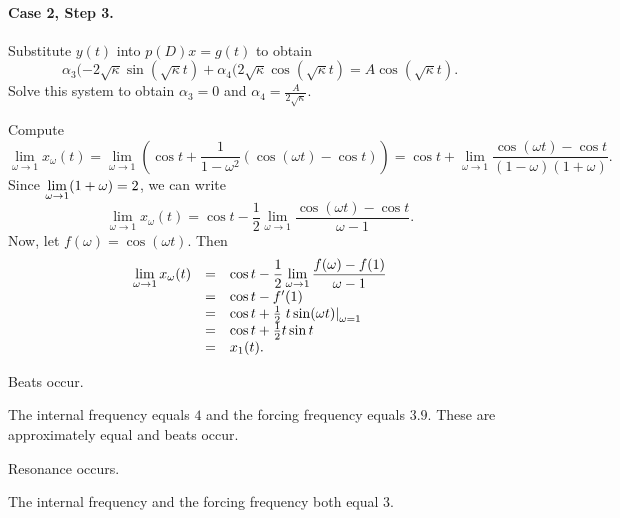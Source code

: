 \paragraph{Case 2, Step 3.} Substitute $y(t)$ into $p(D)x = g(t)$ to obtain
\[
\alpha_3(-2\sqrt{\kappa}\sin(\sqrt{\kappa}t) +
\alpha_4(2\sqrt{\kappa}\cos(\sqrt{\kappa}t)
= A\cos(\sqrt{\kappa}t).
\]
Solve this system to obtain $\alpha_3 = 0$ and
$\alpha_4 = \frac{A}{2\sqrt{\kappa}}$.

Compute
\[
\lim_{\omega \rightarrow 1} x_\omega(t) =
\lim_{\omega \rightarrow 1}\left(\cos t + \frac{1}{1 - \omega^2}
(\cos(\omega t) - \cos t)\right) =
\cos t + \lim_{\omega \rightarrow 1}\frac{\cos(\omega t) - \cos t}
{(1 - \omega)(1 + \omega)}.
\]
Since $\displaystyle \lim_{\omega \rightarrow 1}(1 + \omega) = 2$, we can write
\[
\lim_{\omega \rightarrow 1} x_\omega(t) =
\cos t - \frac{1}{2}\lim_{\omega \rightarrow 1}
\frac{\cos(\omega t) - \cos t}{\omega - 1}.
\]
Now, let $f(\omega) = \cos(\omega t)$.  Then
\[
\begin{array}{rcl}
\displaystyle \lim_{\omega \rightarrow 1} x_\omega(t) & = &
\cos t - \displaystyle \frac{1}{2}\lim_{\omega \rightarrow 1}
\frac{f(\omega) - f(1)}{\omega - 1} \\
& = & \cos t - f'(1) \\
& = & \cos t + \frac{1}{2}\left.t\sin(\omega t)\right|_{\omega = 1} \\
& = & \cos t + \frac{1}{2}t\sin t \\
& = & x_1(t).
\end{array}
\]

 \ans Beats occur.

\soln  The internal frequency equals $4$ and the forcing frequency equals
$3.9$.  These are approximately equal and beats occur.

 \ans Resonance occurs.

\soln  The internal frequency and the forcing frequency both equal $3$.



